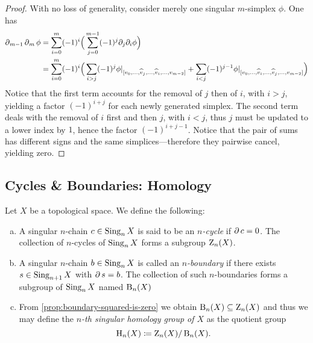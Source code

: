 \begin{proof}
With no loss of generality, consider merely one singular \(m\)-simplex
\(\phi\). One has
\begin{align*}
  \operatorname{\partial}_{m-1} \operatorname{\partial}_m \phi
  &= \sum_{i=0}^m (-1)^i
  \Big( \sum_{j=0}^{m-1} (-1)^j \partial_j \partial_i \phi \Big) \\
  &= \sum_{i=0}^m (-1)^i
  \Big(
    \sum_{i > j} (-1)^j
    \phi|_{[v_0, \dots, \widehat v_j, \dots, \widehat v_i, \dots, v_{m-2}]}
  + \sum_{i < j} (-1)^{j-1}
      \phi|_{[v_0, \dots, \widehat v_i, \dots, \widehat v_j, \dots, v_{m-2}]}
      \Big) \\
\end{align*}
Notice that the first term accounts for the removal of \(j\) then of \(i\), with
\(i > j\), yielding a factor \((-1)^{i + j}\) for each newly generated
simplex. The second term deals with the removal of \(i\) first and then \(j\),
with \(i < j\), thus \(j\) must be updated to a lower index by \(1\), hence the
factor \((-1)^{i + j - 1}\). Notice that the pair of sums has different signs
and the same simplices---therefore they pairwise cancel, yielding zero.
\end{proof}

\subsection{Cycles \& Boundaries: Homology}

\begin{definition}
\label{def:cycle-boundary-homology}
Let \(X\) be a topological space. We define the following:
\begin{enumerate}[(a)]\setlength\itemsep{0em}
\item A singular \(n\)-chain \(c \in \operatorname{Sing}_n X\) is said to be an
  \emph{\(n\)-cycle} if \(\operatorname{\partial} c = 0\). The collection of \(n\)-cycles of
  \(\operatorname{Sing}_n X\) forms a subgroup \(\operatorname{Z}_n(X)\).

\item A singular \(n\)-chain \(b \in \operatorname{Sing}_n X\) is called an
  \emph{\(n\)-boundary} if there exists \(s \in \operatorname{Sing}_{n+1} X\) with
  \(\operatorname{\partial} s = b\). The collection of such \(n\)-boundaries forms a subgroup of
  \(\operatorname{Sing}_n X\) named \(\operatorname{B}_n(X)\)

\item From \cref{prop:boundary-squared-is-zero} we obtain
  \(\operatorname{B}_n(X) \subseteq \operatorname{Z}_n(X)\) and thus we may define the \emph{\(n\)-th
    singular homology group of \(X\)} as the quotient group
  \[
  \operatorname{H}_n(X) \coloneq \operatorname{Z}_n(X) / \operatorname{B}_n(X).
  \]
\end{enumerate}
\end{definition}

